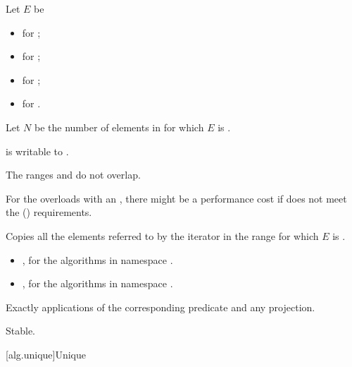 \begin{itemdescr}
\pnum
Let $E$ be
\begin{itemize}
\item {} for ;
\item {} for ;
\item {} for ;
\item {} for .
\end{itemize}

\pnum
Let $N$ be the number of elements in 
for which $E$ is .

\pnum
\mandates
{} is writable to .

\pnum
\expects
The ranges  and 
do not overlap.
\begin{note}
For the overloads with an ,
there might be a performance cost
if  does not meet
the  () requirements.
\end{note}

\pnum
\effects
Copies all the elements referred to by the iterator 
in the range  for which $E$ is .

\pnum
\returns
\begin{itemize}
\item {}, for the algorithms in namespace .
\item {}, for the algorithms in namespace .
\end{itemize}

\pnum
\complexity
Exactly  applications
of the corresponding predicate and any projection.

\pnum
\remarks
Stable.
\end{itemdescr}

[alg.unique]{Unique}

